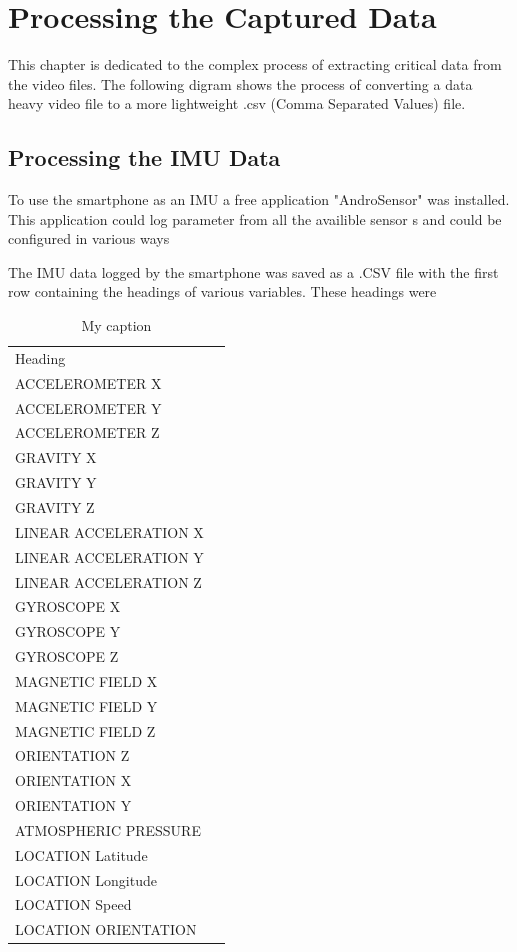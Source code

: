 \chapter{Processing the Captured Data}
This chapter is dedicated to the complex process of extracting critical data from the video files. The following digram shows the process of converting a data heavy video file to a more lightweight .csv (Comma Separated Values) file.

\section{Processing the IMU Data}
To use the smartphone as an IMU a free application "AndroSensor" was installed. This application could log parameter from all the availible sensor s and could be configured in various ways

\cite{androsensor}


The IMU data logged by the smartphone was saved as a .CSV file with the first row containing the headings of various variables. These headings were
\begin{table}
\centering
\caption{My caption}
\label{my-label}
\begin{tabular}{ll}
Heading               &  \\
ACCELEROMETER X       &  \\
ACCELEROMETER Y       &  \\
ACCELEROMETER Z       &  \\
GRAVITY X             &  \\
GRAVITY Y             &  \\
GRAVITY Z             &  \\
LINEAR ACCELERATION X &  \\
LINEAR ACCELERATION Y &  \\
LINEAR ACCELERATION Z &  \\
GYROSCOPE X           &  \\
GYROSCOPE Y           &  \\
GYROSCOPE Z           &  \\
MAGNETIC FIELD X      &  \\
MAGNETIC FIELD Y      &  \\
MAGNETIC FIELD Z      &  \\
ORIENTATION Z         &  \\
ORIENTATION X         &  \\
ORIENTATION Y         &  \\
ATMOSPHERIC PRESSURE  &  \\
LOCATION Latitude     &  \\
LOCATION Longitude    &  \\
LOCATION Speed        &  \\
LOCATION ORIENTATION  & 
\end{tabular}
\end{table}

